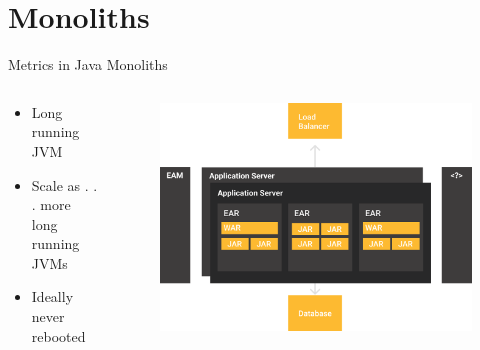 \documentclass{beamer}
\begin{document}
\section{Monoliths}
\begin{frame}{Metrics in Java Monoliths}
\begin{columns}[T] %
	\begin{column}[T]{3cm} %
		\begin{itemize}
			\item Long running JVM
			\item Scale as . . . more long running JVMs
			\item Ideally never rebooted
		\end{itemize}
	\end{column}
	\begin{column}[T]{7cm} %
		\begin{figure}
			\centering
			\includegraphics[width=\linewidth]{Images/monolitos}
		\end{figure}
		
	\end{column}
\end{columns}
\end{frame}
\end{document}

